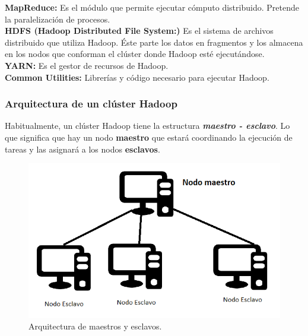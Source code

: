 \begin{UClist}
	\UCli \textbf{MapReduce:} Es el módulo que permite ejecutar cómputo distribuido. Pretende la paralelización de procesos.\\
	\UCli \textbf{HDFS (Hadoop Distributed File System:)} Es el sistema de archivos distribuido que utiliza Hadoop. Éste parte los datos en fragmentos y los almacena en los nodos que conforman el clúster donde Hadoop esté ejecutándose.\\
	\UCli \textbf{YARN:} Es el gestor de recursos de Hadoop.\\
	\UCli \textbf{Common Utilities:} Librerías y código necesario para ejecutar Hadoop.\\
\end{UClist}

\newpage
\subsubsection{Arquitectura de un clúster Hadoop}
Habitualmente, un clúster Hadoop tiene la estructura \textbf{\emph{maestro - esclavo}}. Lo que significa que hay un nodo \textbf{maestro} que estará coordinando la ejecución de tareas y las asignará a los nodos \textbf{esclavos}.\\

\begin{figure}[H]
	\begin{center}
		\hypertarget{fig:arquitecturaMaestroEsclavo}{\hspace{1pt}}
		\includegraphics{capitulo2/images/arquitecturaMaestroEsclavo.png}
		\caption{Arquitectura de maestros y esclavos.}
		\label{fig:arquitecturaMaestroEsclavo}
	\end{center}
\end{figure}

